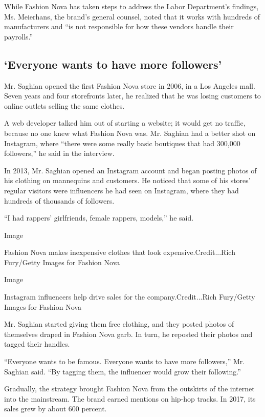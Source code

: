 While Fashion Nova has taken steps to address the Labor Department's
findings, Ms. Meierhans, the brand's general counsel, noted that it
works with hundreds of manufacturers and ``is not responsible for how
these vendors handle their payrolls.''

\hypertarget{everyone-wants-to-have-more-followers}{%
\subsection{`Everyone wants to have more
followers'}\label{everyone-wants-to-have-more-followers}}

Mr. Saghian opened the first Fashion Nova store in 2006, in a Los
Angeles mall. Seven years and four storefronts later, he realized that
he was losing customers to online outlets selling the same clothes.

A web developer talked him out of starting a website; it would get no
traffic, because no one knew what Fashion Nova was. Mr. Saghian had a
better shot on Instagram, where ``there were some really basic boutiques
that had 300,000 followers,'' he said in the interview.

In 2013, Mr. Saghian opened an Instagram account and began posting
photos of his clothing on mannequins and customers. He noticed that some
of his stores' regular visitors were influencers he had seen on
Instagram, where they had hundreds of thousands of followers.

``I had rappers' girlfriends, female rappers, models,'' he said.

Image

Fashion Nova makes inexpensive clothes that look expensive.Credit...Rich
Fury/Getty Images for Fashion Nova

Image

Instagram influencers help drive sales for the company.Credit...Rich
Fury/Getty Images for Fashion Nova

Mr. Saghian started giving them free clothing, and they posted photos of
themselves draped in Fashion Nova garb. In turn, he reposted their
photos and tagged their handles.

``Everyone wants to be famous. Everyone wants to have more followers,''
Mr. Saghian said. ``By tagging them, the influencer would grow their
following.''

Gradually, the strategy brought Fashion Nova from the outskirts of the
internet into the mainstream. The brand earned mentions on hip-hop
tracks. In 2017, its sales grew by about 600 percent.

